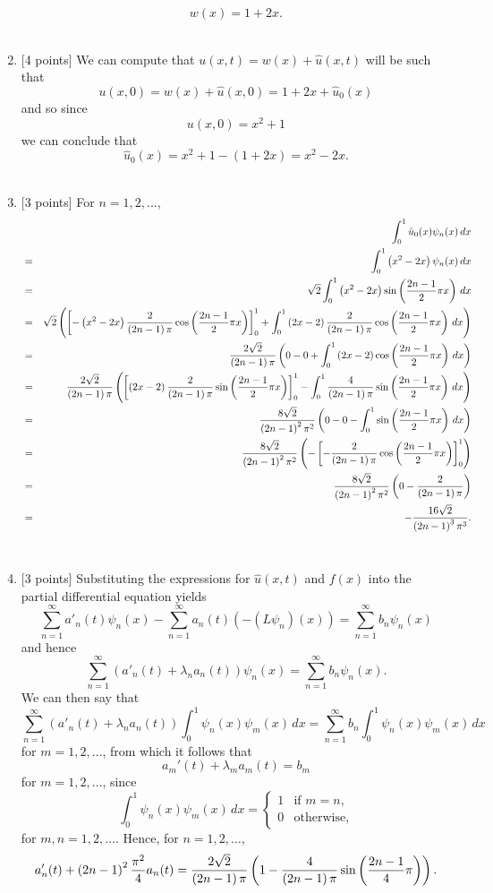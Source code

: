\begin{solution}
\begin{enumerate}
\[
w(x)=1+2x.
\]
\\
\item {[4 points]} We can compute that $u(x,t)=w(x)+\hat{u}(x,t)$ will be such that
\[
u(x,0)=w(x)+\hat{u}(x,0)=1+2x+\hat{u}_0(x)
\]
and so since
\[
u(x,0)=x^2+1
\]
we can conclude that
\[
\hat{u}_0(x)=x^2+1-\left(1+2x\right)=x^2-2x.
\]
\\
\item {[3 points]} For $n=1,2,\ldots$,
\begin{eqnarray*}
&&\int_0^1\hat{u}_0(x)\psi_n(x)\,dx
\\
&=&\int_0^1\left(x^2-2x\right)\psi_n(x)\,dx
\\
&=&\sqrt{2}\int_0^1\left(x^2-2x\right)\sin\left({2n-1\over 2}\pi x\right)\,dx
\\
&=&\sqrt{2}\left(\left[-\left(x^2-2x\right){2\over \left(2n-1\right)\pi}\cos\left({2n-1\over 2}\pi x\right)\right]_0^1+\int_0^1\left(2x-2\right){2\over \left(2n-1\right)\pi}\cos\left({2n-1\over 2}\pi x\right)\,dx\right)
\\
&=&{2\sqrt{2}\over \left(2n-1\right)\pi}\left(0-0+\int_0^1\left(2x-2\right)\cos\left({2n-1\over 2}\pi x\right)\,dx\right)
\\
&=&{2\sqrt{2}\over \left(2n-1\right)\pi}\left(\left[\left(2x-2\right){2\over \left(2n-1\right)\pi}\sin\left({2n-1\over 2}\pi x\right)\right]_0^1-\int_0^1{4\over \left(2n-1\right)\pi}\sin\left({2n-1\over 2}\pi x\right)\,dx\right)
\\
&=&{8\sqrt{2}\over \left(2n-1\right)^2\pi^2}\left(0-0-\int_0^1\sin\left({2n-1\over 2}\pi x\right)\,dx\right)
\\
&=&{8\sqrt{2}\over \left(2n-1\right)^2\pi^2}\left(-\left[-{2\over \left(2n-1\right)\pi}\cos\left({2n-1\over 2}\pi x\right)\right]_0^1\right)
\\
&=&{8\sqrt{2}\over \left(2n-1\right)^2\pi^2}\left(0-{2\over \left(2n-1\right)\pi}\right)
\\
&=&-{16\sqrt{2}\over \left(2n-1\right)^3\pi^3}.
\end{eqnarray*}
\\
\item {[3 points]} Substituting the expressions for $\hat{u}(x,t)$ and $f(x)$ into the partial differential equation yields
\[
\sum_{n=1}^\infty a'_n(t) \psi_n (x)-\sum_{n=1}^\infty a_n(t) \left(-\left(L\psi_n\right) (x)\right)=\sum_{n=1}^\infty b_n \psi_n (x)
\]
and hence
\[
\sum_{n=1}^\infty \left(a'_n(t)+\lambda_na_n(t)\right)\psi_n (x)=\sum_{n=1}^\infty b_n \psi_n (x).
\]
We can then say that
\[
\sum_{n=1}^\infty \left(a'_n(t)+\lambda_na_n(t)\right)\int_0^1\psi_n (x)\psi_m (x)\,dx=\sum_{n=1}^\infty b_n \int_0^1\psi_n (x)\psi_m (x)\,dx
\]
for $m=1,2,\ldots$, from which it follows that
\[
a_m'(t)+\lambda_m a_m(t)=b_m
\]
for $m=1,2,\ldots$, since
\[
\int_0^1\psi_n (x)\psi_m (x)\,dx = \left\{\begin{array}{ll} 1 & \mbox{if }m=n, \\ 0 & \mbox{otherwise,} \end{array}\right.
\]
for $m,n=1,2,\ldots$. Hence, for $n=1,2,\ldots$,
\[
a_n'(t)+\left(2n-1\right)^2 {\pi^2\over4} a_n(t)={2\sqrt{2}\over \left(2n-1\right)\pi}\left(1-{4\over \left(2n-1\right)\pi}\sin\left({2n-1\over 4}\pi\right)\right).
\]


\end{enumerate}
\end{solution}
